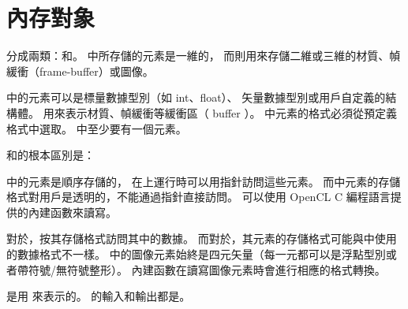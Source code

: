 \section{內存對象}

分成兩類：和。
中所存儲的元素是一維的，
而則用來存儲二維或三維的材質、幀緩衝（frame-buffer）或圖像。

中的元素可以是標量數據型別（如 int、float）、
矢量數據型別或用戶自定義的結構體。
用來表示材質、幀緩衝等緩衝區（ buffer ）。
中元素的格式必須從預定義格式中選取。
中至少要有一個元素。

和的根本區別是：
\startigBase
\item {}中的元素是順序存儲的，
在上運行時可以用指針訪問這些元素。
而中元素的存儲格式對用戶是透明的，不能通過指針直接訪問。
可以使用 OpenCL C 編程語言提供的內建函數來讀寫。

\item 對於，按其存儲格式訪問其中的數據。
而對於，其元素的存儲格式可能與中使用的數據格式不一樣。
中的圖像元素始終是四元矢量（每一元都可以是浮點型別或者帶符號/無符號整形）。
內建函數在讀寫圖像元素時會進行相應的格式轉換。
\stopigBase

是用  來表示的。
的輸入和輸出都是。

